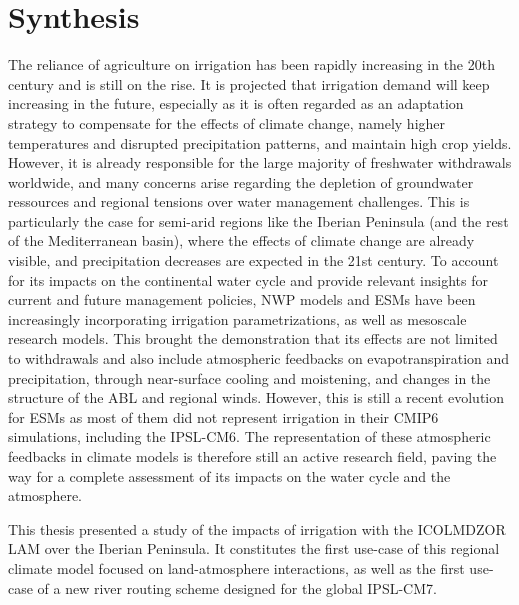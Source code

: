 \section{Synthesis}

The reliance of agriculture on irrigation has been rapidly increasing in the 20th century and is still on the rise. It is projected that irrigation demand will keep increasing in the future, especially as it is often regarded as an adaptation strategy to compensate for the effects of climate change, namely higher temperatures and disrupted precipitation patterns, and maintain high crop yields.
However, it is already responsible for the large majority of freshwater withdrawals worldwide, and many concerns arise regarding the depletion of groundwater ressources and regional tensions over water management challenges. This is particularly the case for semi-arid regions like the Iberian Peninsula (and the rest of the Mediterranean basin), where the effects of climate change are already visible, and precipitation decreases are expected in the 21st century.
To account for its impacts on the continental water cycle and provide relevant insights for current and future management policies, NWP models and ESMs have been increasingly incorporating irrigation parametrizations, as well as mesoscale research models.
This brought the demonstration that its effects are not limited to withdrawals and also include atmospheric feedbacks on evapotranspiration and precipitation, through near-surface cooling and moistening, and changes in the structure of the ABL and regional winds.
However, this is still a recent evolution for ESMs as most of them did not represent irrigation in their CMIP6 simulations, including the IPSL-CM6.
The representation of these atmospheric feedbacks in climate models is therefore still an active research field, paving the way for a complete assessment of its impacts on the water cycle and the atmosphere.

\hfill

This thesis presented a study of the impacts of irrigation with the ICOLMDZOR LAM over the Iberian Peninsula. 
It constitutes the first use-case of this regional climate model focused on land-atmosphere interactions, as well as the first use-case of a new river routing scheme designed for the global IPSL-CM7.

\hfill

